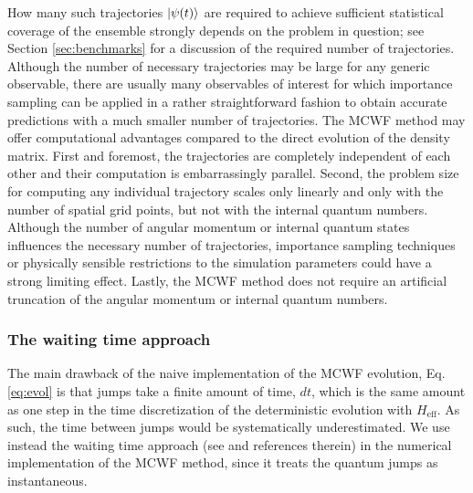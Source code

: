 \documentclass[times,sort&compress,final]{elsarticle}
\begin{document}
How many such trajectories $\ket{\psi(t)}$ are required to achieve sufficient statistical coverage 
of the ensemble strongly depends on the problem in question; see Section \ref{sec:benchmarks} for a discussion 
of the required number of trajectories.
Although the number of necessary trajectories may be large for any generic observable, there are usually 
many observables of interest for which importance sampling can be applied in a rather straightforward 
fashion to obtain accurate predictions with a much smaller number of trajectories. 
The MCWF method may offer computational advantages compared to the direct evolution of the density matrix. 
First and foremost, the trajectories are completely independent of each other and their computation is 
embarrassingly parallel. 
Second, the problem size for computing any individual trajectory scales only linearly and only with the 
number of spatial grid points, but not with the internal quantum numbers. 
Although the number of angular momentum or internal quantum states influences the necessary number of trajectories, importance 
sampling techniques or physically sensible restrictions to the simulation parameters could have a strong limiting effect. 
Lastly, the MCWF method does not require an artificial truncation of the angular momentum or internal quantum numbers. 

\subsubsection{The waiting time approach}
\label{ssec:WTA}

The main drawback of the naive implementation of the MCWF evolution, Eq. \eqref{eq:evol} is that jumps take a finite amount of time, $dt$, which 
is the same amount as one step in the time discretization of the deterministic evolution with $H_\text{eff}$. 
As such, the time between jumps would be systematically underestimated. 
We use instead the waiting time approach (see \cite{Daley:2014fha} and references therein) in the numerical implementation of the MCWF method, since it treats the quantum jumps as instantaneous. 
\end{document}
